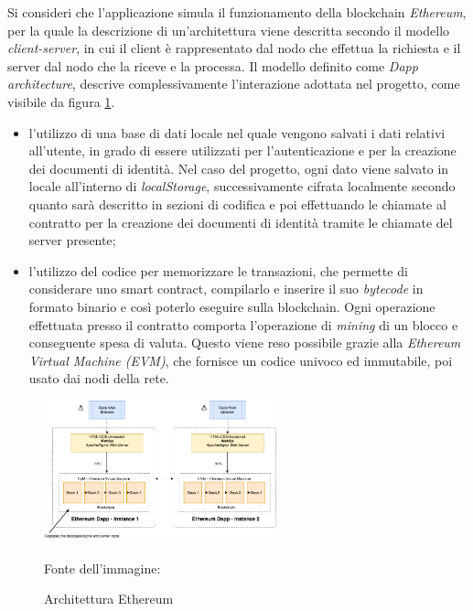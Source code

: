 Si consideri che l'applicazione simula il funzionamento della blockchain \textit{Ethereum}, per la quale la descrizione di un'architettura viene
descritta secondo il modello \textit{client-server}, in cui il client è rappresentato dal nodo che effettua la richiesta e il server dal nodo che la riceve e la processa.
Il modello definito come \textit{Dapp architecture}, descrive complessivamente l'interazione adottata nel progetto, come visibile da figura \ref{fig:eth-architecture}.
\begin{itemize}
\item l'utilizzo di una base di dati locale nel quale vengono salvati i dati relativi all'utente, in grado di essere utilizzati per l'autenticazione e per la creazione dei documenti di identità.
Nel caso del progetto, ogni dato viene salvato in locale all'interno di \textit{localStorage}, successivamente cifrata localmente secondo quanto sarà descritto in sezioni di codifica e 
poi effettuando le chiamate al contratto per la creazione dei documenti di identità tramite le chiamate del server presente;
\item l'utilizzo del codice per memorizzare le transazioni, che permette di considerare uno smart contract, compilarlo e inserire il suo \textit{bytecode} in formato binario
e così poterlo eseguire sulla blockchain. Ogni operazione effettuata presso il contratto comporta l'operazione di \textit{mining} di un blocco e conseguente spesa di valuta.
Questo viene reso possibile grazie alla \textit{Ethereum Virtual Machine (EVM)}, che fornisce un codice univoco ed immutabile, poi usato dai nodi della rete.
\end{itemize}

\begin{figure}[h]
    \centering
    \includegraphics[width=0.6\textwidth, alt={Descrizione dell'architettura di Ethereum}]{immagini/ethereum-architecture.png}
    \caption{Architettura Ethereum} Fonte dell'immagine: \cite{site:etharchitecture}\label{fig:eth-architecture}
\end{figure}

